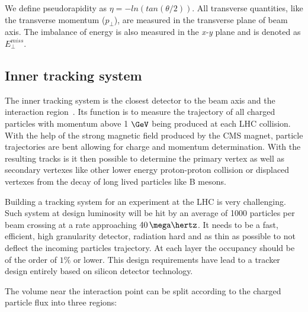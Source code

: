 We define pseudorapidity as $\eta = -ln(tan(\theta/2))$. All transverse quantities, like the transverse momentum ($p_\perp$), are measured in the transverse plane of beam axis. The imbalance of energy is also measured in the \textit{x-y} plane and is denoted as $E^{miss}_\perp$.

\subsection{Inner tracking system}
\label{SUBSECTION:ExperimentalApparatus_CMS_Tracker}


The inner tracking system is the closest detector to the beam axis and the interaction region~\cite{CMSTDR:CMSTracker,CMSTDR:CMSTrackerAddendum}. Its function is to measure the trajectory of all charged particles with momentum above 1 $\GeV$ being produced at each \gls{LHC} collision. With the help of the strong magnetic field produced by the \gls{CMS} magnet, particle trajectories are bent allowing for charge and momentum determination. With the resulting tracks is it then possible to determine the primary vertex as well as secondary vertexes like other lower energy proton-proton collision or displaced vertexes from the decay of long lived particles like B mesons.

Building a tracking system for an experiment at the \gls{LHC} is very challenging. Such system at design luminosity will be hit by an average of 1000 particles per beam crossing at a rate approaching $40\,\mega\hertz$. It needs to be a fast, efficient, high granularity detector, radiation hard and as thin as possible to not deflect the incoming particles trajectory. At each layer the occupancy should be of the order of $1\%$ or lower. This design requirements have lead to a tracker design entirely based on silicon detector technology. 

The volume near the interaction point can be split according to the charged particle flux into three regions:

